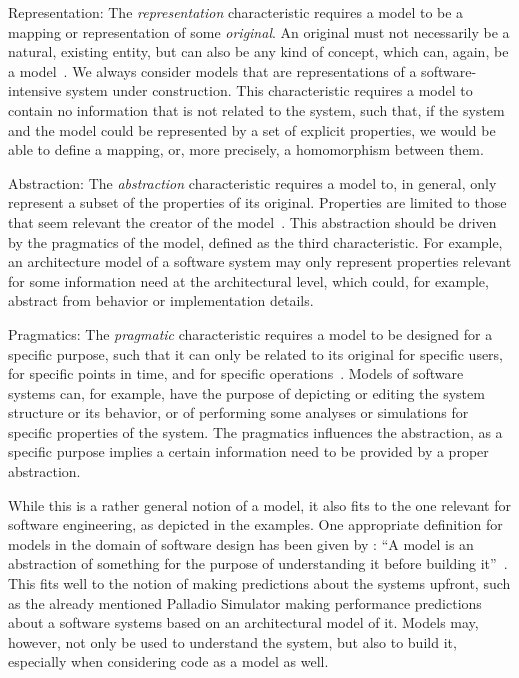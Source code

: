 \begin{properdescription}
\item[Representation:] 
The \emph{representation} characteristic requires a model to be a mapping or representation of some \emph{original}.
An original must not necessarily be a natural, existing entity, but can also be any kind of concept, which can, again, be a model~\cite[p.~131]{stachowiak1973modelltheorie-Book}.
We always consider models that are representations of a software-intensive system under construction.
This characteristic requires a model to contain no information that is not related to the system, such that, if the system and the model could be represented by a set of explicit properties, we would be able to define a mapping, or, more precisely, a homomorphism between them.

\item[Abstraction:] 
The \emph{abstraction} characteristic requires a model to, in general, only represent a subset of the properties of its original.
Properties are limited to those that seem relevant the creator of the model~\cite[p.~132]{stachowiak1973modelltheorie-Book}.
This abstraction should be driven by the pragmatics of the model, defined as the third characteristic.
For example, an architecture model of a software system may only represent properties relevant for some information need at the architectural level, which could, for example, abstract from behavior or implementation details.

\item[Pragmatics:] 
The \emph{pragmatic} characteristic requires a model to be designed for a specific purpose, such that it can only be related to its original for specific users, for specific points in time, and for specific operations~\cite[pp.~132]{stachowiak1973modelltheorie-Book}.
Models of software systems can, for example, have the purpose of depicting or editing the system structure or its behavior, or of performing some analyses or simulations for specific properties of the system.
The pragmatics influences the abstraction, as a specific purpose implies a certain information need to be provided by a proper abstraction.
\end{properdescription}

While this is a rather general notion of a model, it also fits to the one relevant for software engineering, as depicted in the examples.
One appropriate definition for models in the domain of software design has been given by \citeauthor{rumbaugh2005objectoriented-Book}:
\enquote{A model is an abstraction of something for the purpose of understanding it before building it}~\cite[p.~15]{rumbaugh2005objectoriented-Book}.
This fits well to the notion of making predictions about the systems upfront, such as the already mentioned Palladio Simulator making performance predictions about a software systems based on an architectural model of it.
Models may, however, not only be used to understand the system, but also to build it, especially when considering code as a model as well.


